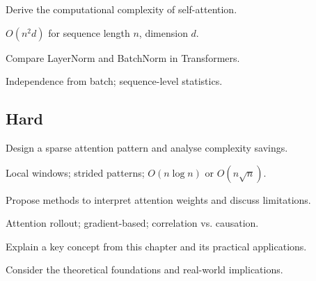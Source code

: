 \begin{exercisebox}[medium]
\begin{problem}
Derive the computational complexity of self-attention.
\end{problem}
\begin{hintbox}
$O(n^2 d)$ for sequence length $n$, dimension $d$.
\end{hintbox}
\end{exercisebox}


\begin{exercisebox}[medium]
\begin{problem}
Compare LayerNorm and BatchNorm in Transformers.
\end{problem}
\begin{hintbox}
Independence from batch; sequence-level statistics.
\end{hintbox}
\end{exercisebox}


\subsection*{Hard}

\begin{exercisebox}[hard]
\begin{problem}
Design a sparse attention pattern and analyse complexity savings.
\end{problem}
\begin{hintbox}
Local windows; strided patterns; $O(n \log n)$ or $O(n\sqrt{n})$.
\end{hintbox}
\end{exercisebox}


\begin{exercisebox}[hard]
\begin{problem}
Propose methods to interpret attention weights and discuss limitations.
\end{problem}
\begin{hintbox}
Attention rollout; gradient-based; correlation vs. causation.
\end{hintbox}
\end{exercisebox}



\begin{exercisebox}[hard]
\begin{problem}
Explain a key concept from this chapter and its practical applications.
\end{problem}
\begin{hintbox}
Consider the theoretical foundations and real-world implications.
\end{hintbox}
\end{exercisebox}


